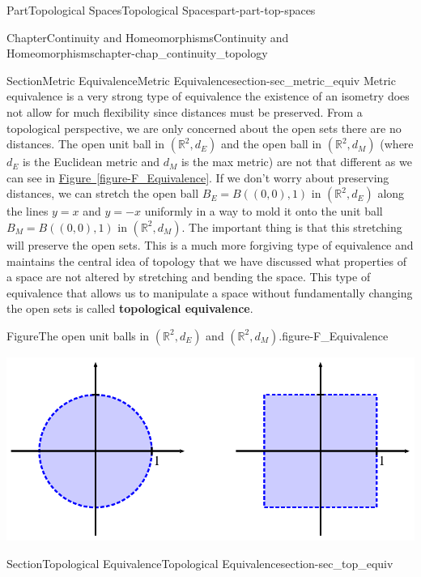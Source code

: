 \documentclass[oneside,10pt,]{book}
\newcommand{\xreffont}{\relax}
\newcommand{\terminology}[1]{\textbf{#1}}
\numberwithin{equation}{chapter}
\newcommand{\R}{\mathbb{R}}
\begin{document}
\begin{partptx}{Part}{Topological Spaces}{}{Topological Spaces}{}{}{part-part-top-spaces}
\begin{chapterptx}{Chapter}{Continuity and Homeomorphisms}{}{Continuity and Homeomorphisms}{}{}{chapter-chap_continuity_topology}
\begin{sectionptx}{Section}{Metric Equivalence}{}{Metric Equivalence}{}{}{section-sec_metric_equiv}
Metric equivalence is a very strong type of equivalence \textemdash{} the existence of an isometry does not allow for much flexibility since distances must be preserved. From a topological perspective, we are only concerned about the open sets \textemdash{} there are no distances. The open unit ball in \((\R^2, d_E)\) and the open ball in \((\R^2, d_M)\) (where \(d_E\) is the Euclidean metric and \(d_M\) is the max metric) are not that different as we can see in \hyperref[figure-F_Equivalence]{Figure~{\xreffont\ref{figure-F_Equivalence}}}. If we don't worry about preserving distances, we can stretch the open ball \(B_E = B((0,0),1)\) in \((\R^2, d_E)\) along the lines \(y=x\) and \(y=-x\) uniformly in a way to mold it onto the unit ball \(B_M = B((0,0),1)\) in \((\R^2, d_M)\). The important thing is that this stretching will preserve the open sets. This is a much more forgiving type of equivalence and maintains the central idea of topology that we have discussed \textemdash{} what properties of a space are not altered by stretching and bending the space. This type of equivalence that allows us to manipulate a space without fundamentally changing the open sets is called \terminology{topological equivalence}.%
\begin{figureptx}{Figure}{The open unit balls in \((\R^2, d_E)\) and \((\R^2, d_M)\).}{figure-F_Equivalence}{}%
\begin{image}{0.15}{0.7}{0.15}{}%
\includegraphics[width=\linewidth]{external/Equivalence.pdf}
\end{image}%
\tcblower
\end{figureptx}%
\end{sectionptx}
%
%
\typeout{************************************************}
\typeout{************************************************}
%
\begin{sectionptx}{Section}{Topological Equivalence}{}{Topological Equivalence}{}{}{section-sec_top_equiv}

\end{sectionptx}
\end{chapterptx}
\end{partptx}
\end{document}
